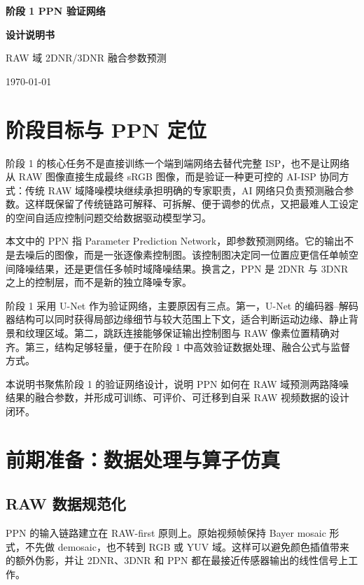 \documentclass[UTF8,zihao=-4]{ctexart}
\begin{document}
\begin{titlepage}
  \centering
  \vspace*{3.1cm}
  {\Huge\bfseries 阶段 1 PPN 验证网络\par}
  \vspace{0.5cm}
  {\Huge\bfseries 设计说明书\par}
  \vspace{0.9cm}
  {\Large RAW 域 2DNR/3DNR 融合参数预测\par}
  \vfill
  {\large \today\par}
\end{titlepage}

\tableofcontents
\newpage

\section{阶段目标与 PPN 定位}

阶段 1 的核心任务不是直接训练一个端到端网络去替代完整 ISP，也不是让网络从 RAW 图像直接生成最终 sRGB 图像，而是验证一种更可控的 AI-ISP 协同方式：传统 RAW 域降噪模块继续承担明确的专家职责，AI 网络只负责预测融合参数。这样既保留了传统链路可解释、可拆解、便于调参的优点，又把最难人工设定的空间自适应控制问题交给数据驱动模型学习。

本文中的 PPN 指 Parameter Prediction Network，即参数预测网络。它的输出不是去噪后的图像，而是一张逐像素控制图。该控制图决定同一位置应更信任单帧空间降噪结果，还是更信任多帧时域降噪结果。换言之，PPN 是 2DNR 与 3DNR 之上的控制层，而不是新的独立降噪专家。

阶段 1 采用 U-Net 作为验证网络，主要原因有三点。第一，U-Net 的编码器--解码器结构可以同时获得局部边缘细节与较大范围上下文，适合判断运动边缘、静止背景和纹理区域。第二，跳跃连接能够保证输出控制图与 RAW 像素位置精确对齐。第三，结构足够轻量，便于在阶段 1 中高效验证数据处理、融合公式与监督方式。

本说明书聚焦阶段 1 的验证网络设计，说明 PPN 如何在 RAW 域预测两路降噪结果的融合参数，并形成可训练、可评价、可迁移到自采 RAW 视频数据的设计闭环。

\section{前期准备：数据处理与算子仿真}

\subsection{RAW 数据规范化}

PPN 的输入链路建立在 RAW-first 原则上。原始视频帧保持 Bayer mosaic 形式，不先做 demosaic，也不转到 RGB 或 YUV 域。这样可以避免颜色插值带来的额外伪影，并让 2DNR、3DNR 和 PPN 都在最接近传感器输出的线性信号上工作。
\end{document}
